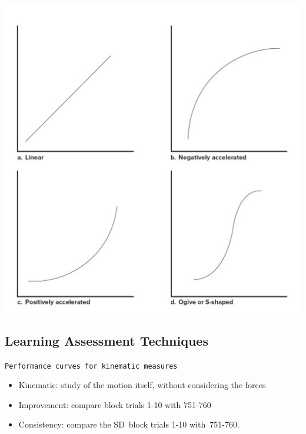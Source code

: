 \documentclass[
  letterpaper,
  DIV=11,
  numbers=noendperiod]{scrartcl}
\providecommand{\tightlist}{%
  \setlength{\itemsep}{0pt}\setlength{\parskip}{0pt}}\usepackage{longtable,booktabs,array}
\begin{document}
\includegraphics{images/Screenshot 2023-09-11 at 11.13.16 AM.png}

\hypertarget{learning-assessment-techniques-1}{%
\subsection{Learning Assessment
Techniques}\label{learning-assessment-techniques-1}}

\texttt{Performance\ curves\ for\ kinematic\ measures}

\begin{itemize}
\tightlist
\item
  Kinematic: study of the motion itself, without considering the forces
\item
  Improvement: compare block trials 1-10 with 751-760
\item
  Consistency: compare the SD~block trials 1-10 with~751-760.
\end{itemize}
\end{document}
